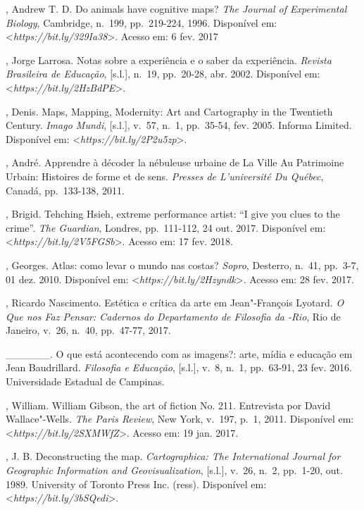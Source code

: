 \begin{Parskip}
, Andrew T. D. Do animals have cognitive maps? \emph{The
Journal of Experimental Biology}, Cambridge, n.~199, pp.~219-224, 1996.
Disponível em:
\textless{}\emph{https://bit.ly/329Ia38}\textgreater{}.
Acesso em: 6 fev. 2017

, Jorge Larrosa. Notas sobre a experiência e o saber da
experiência. \emph{Revista Brasileira de Educação}, {[}s.l.{]}, n.~19,
pp.~20-28, abr. 2002. Disponível em:
\textless{}\emph{https://bit.ly/2HzBdPE}\textgreater{}. %

, Denis. Maps, Mapping, Modernity: Art and Cartography in the
Twentieth Century. \emph{Imago Mundi}, {[}s.l.{]}, v.~57, n.~1,
pp.~35-54, fev. 2005. Informa  Limited.
Disponível em: \textless{}\emph{https://bit.ly/2P2u5zp}\textgreater{}. %

, André. Apprendre à décoder la nébuleuse urbaine de La
Ville Au Patrimoine Urbain: Histoires de forme et de sens. \emph{Presses de
L'université Du Québec}, Canadá, pp.~133-138, 2011.

, Brigid. Tehching Hsieh, extreme performance artist: ``I give
you clues to the crime''. \emph{The Guardian}, Londres, pp.~111-112, 24
out. 2017. Disponível em:
\textless{}\emph{https://bit.ly/2V5FGSb}\textgreater{}. Acesso em: 17
fev. 2018.

, Georges. Atlas: como levar o mundo nas costas?
\emph{Sopro}, Desterro, n.~41, pp.~3-7, 01 dez. 2010. Disponível em:
\textless{}\emph{https://bit.ly/2Hzyndk}\textgreater{}.
Acesso em: 28 fev. 2017.

, Ricardo Nascimento. Estética e crítica da arte em
Jean"-François Lyotard. \emph{O Que nos Faz Pensar: Cadernos do
Departamento de Filosofia da -Rio}, Rio de Janeiro, v.~26, n.~40,
pp.~47-77, 2017.

\_\_\_\_\_\_. O que está acontecendo com as imagens?: arte, mídia e
educação em Jean Baudrillard. \emph{Filosofia e Educação}, {[}s.l.{]},
v.~8, n.~1, pp.~63-91, 23 fev. 2016. Universidade Estadual de Campinas.

, William. William Gibson, the art of fiction No. 211. Entrevista por David
Wallace"-Wells. \emph{The
Paris Review}, New York, v.~197, p.~1, 2011. Disponível em:
\textless{}\emph{https://bit.ly/2SXMWfZ}\textgreater{}. Acesso em: 19 jan. 2017.

, J. B. Deconstructing the map. \emph{Cartographica: The
International Journal for Geographic Information and Geovisualization},
{[}s.l.{]}, v.~26, n.~2, pp.~1-20, out. 1989. University of Toronto Press
Inc. (ress). Disponível em: \textless{}\emph{https://bit.ly/3bSQedi}\textgreater{}. %


\end{Parskip}
